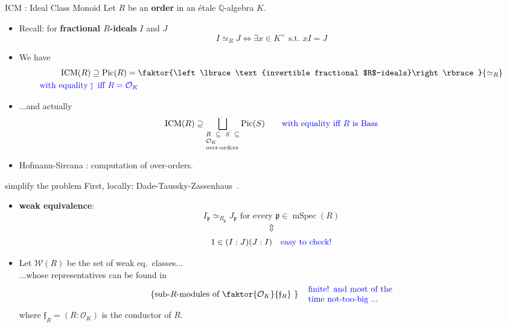 \documentclass[usenames,dvipsnames]{beamer}
\def\Q{\mathbb{Q}}
\DeclareMathOperator{\ICM}{ICM}
\DeclareMathOperator{\Pic}{Pic}
\DeclareMathOperator{\mSpec}{mSpec}
\newcommand{\cO}{{\mathcal O}}
\newcommand{\cW}{{\mathcal W}}
\newcommand{\p}{{\mathfrak p}}
\newcommand{\frf}{{\mathfrak f}}
\newcommand{\set}[1]{\left\lbrace#1\right\rbrace }
\newcommand{\blue}[1]{\textcolor{blue}{#1}}
\begin{document}
\begin{frame}{ICM : Ideal Class Monoid}
    Let $R$ be an {\bf order} in an \'etale  $\Q$-algebra $K$.
    \begin{itemize}
\pause
    \item Recall: for {\bf fractional $R$-ideals} $I$ and $J$
	 \[ I\simeq_R J \Longleftrightarrow \exists x \in K^\times \text{ s.t.~} xI=J \]
\pause
    \item We have
   	\begin{align*}
    \ICM(R) & \supseteq \Pic(R)=\faktor{\set{\text{invertible fractional $R$-ideals}}}{\simeq_R} \\
	\blue{\text{with equality }} & \blue{\rotatebox[origin=c]{90}{$\large\rightsquigarrow$}\mkern2mu \text{ iff } R=\cO_K }
    \end{align*}
\pause 
    \item ...and actually
    \[ \ICM(R) \supseteq \bigsqcup_{\scriptsize\parbox{5 em}{$R\subseteq S \subseteq \cO_K$\\over-orders}}\Pic(S) \qquad   
     \textcolor{blue}{\text{with equality iff $R$ is Bass}} \]
\pause
    \item Hofmann-Sircana \cite{HofmannSircana20}: computation of over-orders.
\end{itemize}
\end{frame}

\begin{frame}{ simplify the problem  }
    First, locally: Dade-Taussky-Zassenhaus~\cite{dadetz62}.
    \begin{itemize}
\pause 
    \item  \textbf{weak equivalence}:
    \[I_{\p}\simeq_{R_{\p}} J_{\p} \text{ for every } {\p} \in \mSpec(R)\]
\pause
    \vspace{-6mm}\[\Updownarrow\]
    \[1\in (I:J)(J:I)\quad \textcolor{blue}{\text{easy to check!}}\]
\pause
    \item Let $\cW(R)$ be the set of weak eq.~classes...\\
\pause
    ...whose representatives can be found in
    \[\set{\text{sub-$R$-modules of $\faktor{\cO_K}{\frf_R}$ }} \quad \textcolor{blue}{\parbox{10 em}{finite! and most of the time not-too-big ...}}\]
    where $\frf_R=(R:\cO_K)$ is the conductor of $R$.
    \end{itemize}
\end{frame}
\end{document}
